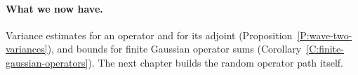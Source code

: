 \paragraph{What we now have.}
Variance estimates for an operator and for its adjoint
(Proposition~\ref{P:wave-two-variances}), and bounds for finite Gaussian
operator sums (Corollary~\ref{C:finite-gaussian-operators}). The next chapter
builds the random operator path itself.
